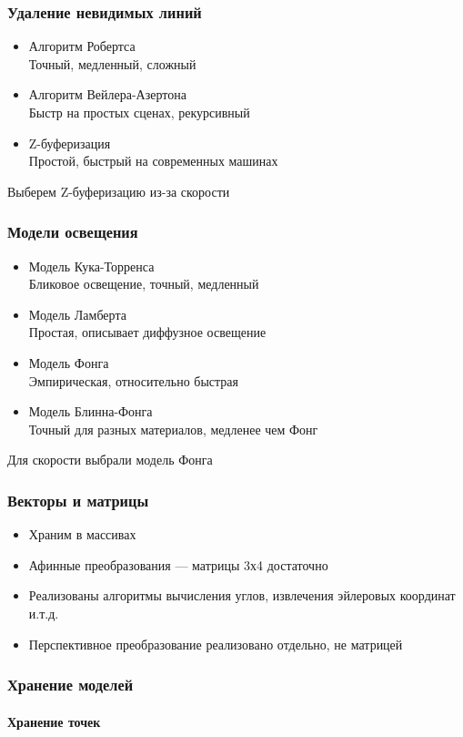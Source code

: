 \documentclass{beamer}
\begin{document}
\begin{frame}
\begin{frame}
\frametitle{Удаление невидимых линий}

\begin{itemize}
\item Алгоритм Робертса \\
Точный, медленный, сложный
\item Алгоритм Вейлера-Азертона \\
Быстр на простых сценах, рекурсивный
\item Z-буферизация \\
Простой, быстрый на современных машинах
\end{itemize}
Выберем Z-буферизацию из-за скорости
\end{frame}

\begin{frame}
\frametitle{Модели освещения}

\begin{itemize}
\item Модель Кука-Торренса \\
Бликовое освещение, точный, медленный
\item Модель Ламберта \\
Простая, описывает диффузное освещение
\item Модель Фонга \\
Эмпирическая, относительно быстрая
\item Модель Блинна-Фонга \\
Точный для разных материалов, медленее чем Фонг
\end{itemize}
Для скорости выбрали модель Фонга
\end{frame}

\begin{frame}
\frametitle{Векторы и матрицы}

\begin{itemize}
\item Храним в массивах
\item Афинные преобразования --- матрицы 3х4 достаточно
\item Реализованы алгоритмы вычисления углов, извлечения эйлеровых координат и.т.д.
\item Перспективное преобразование реализовано отдельно, не матрицей
\end{itemize}
\end{frame}

\begin{frame}
\frametitle{Хранение моделей}
\framesubtitle{Хранение точек}


\end{frame}
\end{frame}
\end{document}

